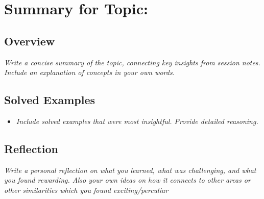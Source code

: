 \section{Summary for Topic: \textit{\underline{\hspace{5cm}}}}
\subsection*{Overview}
\textit{Write a concise summary of the topic, connecting key insights from session notes. Include an explanation of concepts in your own words.}

\subsection*{Solved Examples}
\begin{itemize}
    \item \textit{Include solved examples that were most insightful. Provide detailed reasoning.}
\end{itemize}

\subsection*{Reflection}
\textit{Write a personal reflection on what you learned, what was challenging, and what you found rewarding. Also your own ideas on how it connects to other areas or other similarities which you found exciting/perculiar}
